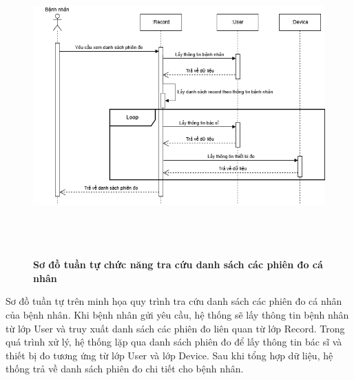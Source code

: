 \begin{figure}[H]
	\centering
	\includegraphics[width=15cm,height=11.5cm]{Images/sequence/record/getByPatientId.drawio.png}
	\caption[Sơ đồ tuần tự chức năng tra cứu danh sách các phiên đo cá nhân]{\bfseries \fontsize{12pt}{0pt}
		\selectfont Sơ đồ tuần tự chức năng tra cứu danh sách các phiên đo cá nhân}
	\label{sequence_get_record_by_patient} %
\end{figure}
Sơ đồ tuần tự trên minh họa quy trình tra cứu danh sách các phiên đo cá nhân của bệnh nhân. Khi bệnh nhân gửi yêu cầu, hệ thống sẽ lấy thông tin bệnh nhân từ lớp User và truy xuất danh sách các phiên đo liên quan từ lớp Record.
Trong quá trình xử lý, hệ thống lặp qua danh sách phiên đo để lấy thông tin bác sĩ và thiết bị đo tương ứng từ lớp User và lớp Device. Sau khi tổng hợp dữ liệu, hệ thống trả về danh sách phiên đo chi tiết cho bệnh nhân.

